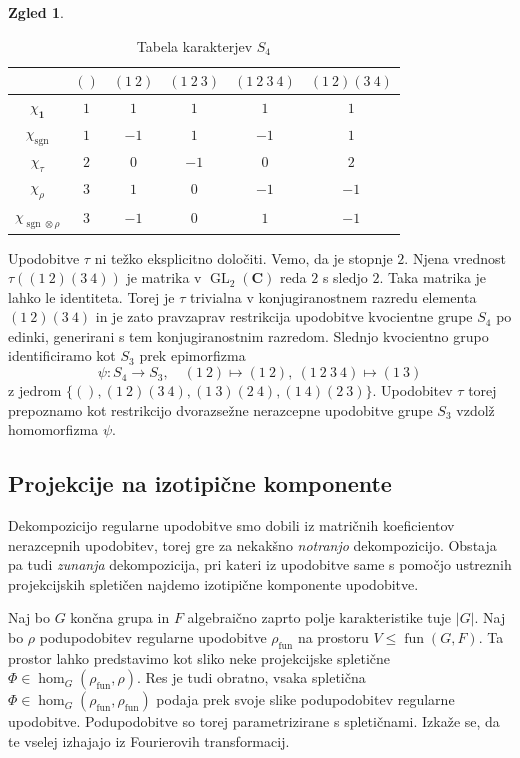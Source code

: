 \documentclass[11pt]{book}
\def\CC{\mathbf{C}}
\def\oneone{\mathbf{1}}
\DeclareMathOperator\sgn{sgn}
\DeclareMathOperator\fun{fun}
\DeclareMathOperator\GL{GL}
\theoremstyle{definition}
\theoremstyle{zgled}
\newtheorem{zgled}[theorem]{Zgled}
\theoremstyle{zgledbrezstevilke}
\theoremstyle{odprtproblem}
\theoremstyle{domacanaloga}
\theoremstyle{izrek}
\begin{document}
\begin{zgled}
\begin{table}[t]
    \centering
\begin{tabular}{c|ccccc}
    & $()$ & $(1 \ 2)$ & $(1 \ 2 \ 3)$ &  $(1 \ 2 \ 3 \ 4)$ &  $(1 \ 2)(3 \ 4)$\\ \hline
    $\chi_{\oneone}$ & $1$ & $1$ & $1$ & $1$ & $1$ \\
    $\chi_{\sgn}$ & $1$ & $-1$ & $1$ & $-1$ & $1$ \\
    $\chi_{\tau}$ & $2$ & $0$ & $-1$ & $0$ & $2$  \\
    $\chi_{\rho}$ & $3$ & $1$ & $0$ & $-1$ & $-1$  \\
    $\chi_{\sgn \otimes \rho}$ & $3$ & $-1$ & $0$ & $1$ & $-1$  \\
\end{tabular}
\caption{Tabela karakterjev $S_4$}
\end{table}

Upodobitve $\tau$ ni težko eksplicitno določiti. Vemo, da je stopnje $2$. Njena vrednost $\tau((1 \ 2)(3 \ 4))$ je matrika v $\GL_2(\CC)$ reda $2$ s sledjo $2$. Taka matrika je lahko le identiteta. Torej je $\tau$ trivialna v konjugiranostnem razredu elementa $(1 \ 2)(3 \ 4)$ in je zato pravzaprav restrikcija upodobitve kvocientne grupe $S_4$ po edinki, generirani s tem konjugiranostnim razredom. Slednjo kvocientno grupo identificiramo kot $S_3$ prek epimorfizma
\[
    \psi \colon S_4 \to S_3, \quad
    (1 \ 2) \mapsto (1 \ 2), \
    (1 \ 2 \ 3 \ 4) \mapsto (1 \ 3)
\]
z jedrom $\{ (), (1 \ 2)(3 \ 4), (1 \ 3)(2 \ 4), (1 \ 4)(2 \ 3) \}$. Upodobitev $\tau$ torej prepoznamo kot restrikcijo dvorazsežne nerazcepne upodobitve grupe $S_3$ vzdolž homomorfizma $\psi$.
\end{zgled}


\subsection{Projekcije na izotipične komponente}

Dekompozicijo regularne upodobitve smo dobili iz matričnih koeficientov nerazcepnih upodobitev, torej gre za nekakšno \emph{notranjo} dekompozicijo. Obstaja pa tudi \emph{zunanja} dekompozicija, pri kateri iz upodobitve same s pomočjo ustreznih projekcijskih spletičen najdemo izotipične komponente upodobitve.

Naj bo $G$ končna grupa in $F$ algebraično zaprto polje karakteristike tuje $|G|$. Naj bo $\rho$ podupodobitev regularne upodobitve $\rho_{\fun}$ na prostoru $V \leq \fun(G,F)$. Ta prostor lahko predstavimo kot sliko neke projekcijske spletične $\Phi \in \hom_G(\rho_{\fun}, \rho)$. Res je tudi obratno, vsaka spletična $\Phi \in \hom_G(\rho_{\fun}, \rho_{\fun})$ podaja prek svoje slike podupodobitev regularne upodobitve. Podupodobitve so torej parametrizirane s spletičnami. Izkaže se, da te vselej izhajajo iz Fourierovih transformacij.
\end{document}
